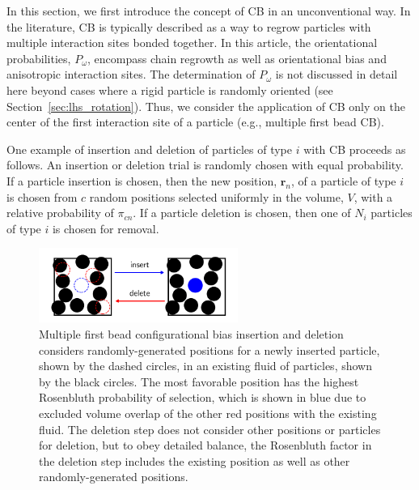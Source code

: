 \documentclass[
  9pt,
  bestpractices,
  pubversion,
]{livecoms}
\begin{document}
In this section, we first introduce the concept of CB \cite{rosenbluth_monte_1955, siepmann_configurational_1992, mooij_direct_1992, de_pablo_estimation_1992} in an unconventional way.
In the literature, CB is typically described as a way to regrow particles with multiple interaction sites bonded together.
In this article, the orientational probabilities, $P_{\omega}$, encompass chain regrowth as well as orientational bias and anisotropic interaction sites.
The determination of $P_{\omega}$ is not discussed in detail here beyond cases where a rigid particle is randomly oriented (see Section~\ref{sec:lhs_rotation}).
Thus, we consider the application of CB only on the center of the first interaction site of a particle (e.g., multiple first bead CB).

One example of insertion and deletion of particles of type $i$ with CB proceeds as follows.
An insertion or deletion trial is randomly chosen with equal probability.
If a particle insertion is chosen, then the new position, $\mathbf{r}_n$, of a particle of type $i$ is chosen from ${c}$ random positions selected uniformly in the volume, $V$, with a relative probability of $\pi_{cn}$.
If a particle deletion is chosen, then one of $N_i$ particles of type $i$ is chosen for removal.

\begin{figure}
\begin{centering}
\includegraphics[width=6.5cm]{../figures/muvt_cb.pdf}
\caption{
Multiple first bead configurational bias insertion and deletion considers randomly-generated positions for a newly inserted particle, shown by the dashed circles, in an existing fluid of particles, shown by the black circles.
The most favorable position has the highest Rosenbluth probability of selection, which is shown in blue due to excluded volume overlap of the other red positions with the existing fluid.
The deletion step does not consider other positions or particles for deletion, but to obey detailed balance, the Rosenbluth factor in the deletion step includes the existing position as well as other randomly-generated positions.
}
\label{fig:muvt_cb}
\end{centering}
\end{figure}
\end{document}
